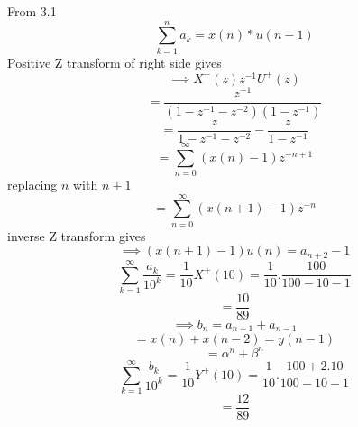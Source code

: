 \documentclass[journal,12pt,twocolumn]{IEEEtran}
\renewcommand\thesection{\arabic{section}}
\begin{document}
\begin{enumerate}[label=\thesection.\arabic*,ref=\thesection.\theenumi]
\solution

From 3.1 
\[\sum_{k=1}^na_k = x(n)*u(n-1)\]
Positive Z transform of right side gives
\[\implies X^+(z)z^{-1}U^+(z)\]
\[=\frac{z^{-1}}{(1-z^{-1}-z^{-2})(1-z^{-1})}\]
\[=\frac{z}{1-z^{-1}-z^{-2}} - \frac{z}{1-z^{-1}}\]
\[=\sum_{n=0}^\infty (x(n)-1)z^{-n+1}\]
replacing $n$ with $n+1$
\[=\sum_{n=0}^\infty (x(n+1)-1)z^{-n}\]
inverse Z transform gives
\[\implies (x(n+1) -1)u(n) = a_{n+2}-1\]
\[\sum_{k=1}^\infty\frac{a_k}{10^k} = \frac{1}{10}X^+(10) = \frac{1}{10}.\frac{100}{100 -10 -1}\]
\[=\frac{10}{89}\]
\[\implies b_n = a_{n+1} + a_{n-1}\]
\[ =x(n) + x(n-2) = y(n-1)\]
\[=\alpha^n + \beta^n\]
\[\sum_{k=1}^\infty\frac{b_k}{10^k} = \frac{1}{10}Y^+(10) = \frac{1}{10}.\frac{100 + 2.10}{100 -10 -1}\]
\[ = \frac{12}{89}\]
\end{enumerate}
\end{document}
